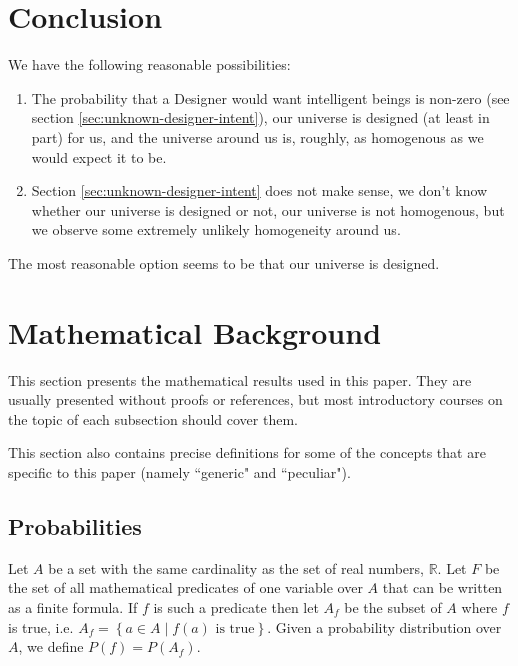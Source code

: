 \documentclass[a4paper
]{article}
\def\reale{\mathbb{R}}
\newcommand{\multime}[1]{\left\{ #1 \right\}}
\newcommand{\ghilimele}[1]{``#1"}
\begin{document}
\section{Conclusion}
\label{sec:conclusion}

We have the following reasonable possibilities:

\begin{enumerate}
\item The probability that a Designer would want intelligent beings
      is non-zero (see section \ref{sec:unknown-designer-intent}),
      our universe is designed (at least in part) for us,
      and the universe around us is, roughly, as homogenous as we would
      expect it to be.
\item Section \ref{sec:unknown-designer-intent} does not make sense,
      we don't know whether our universe is designed or not,
      our universe is not homogenous, but we observe some
      extremely unlikely homogeneity around us.
\end{enumerate}

The most reasonable option seems to be that our universe is designed.

\section{Mathematical Background}
\label{sec:background}

This section presents the mathematical results used in this paper. They are
usually presented without proofs or references, but most introductory courses
on the topic of each subsection should cover them.

This section also contains precise definitions for some of the concepts that
are specific to this paper
(namely \ghilimele{generic} and \ghilimele{peculiar}).

\subsection{Probabilities}
\label{sec:probabilities}

Let $A$ be a set with the same cardinality as the set of real numbers, $\reale$.
Let $F$ be the set of
all mathematical predicates of one variable over $A$ that can be written as a
finite formula.
If $f$ is such a predicate then let $A_f$ be the subset of
$A$ where $f$ is true, i.e. $A_f=\multime{a\in A\mid f(a) \mbox{ is true}}$.
Given a probability distribution over $A$, we define $P(f)=P(A_f)$.
\end{document}
